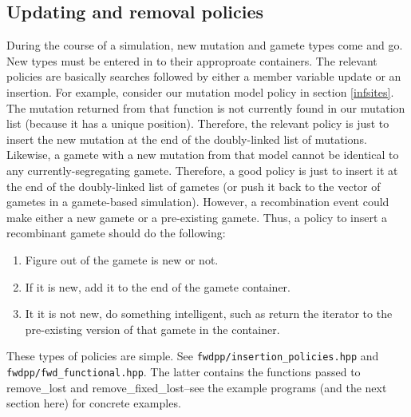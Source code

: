 \documentclass{article}
\begin{document}
\subsection{Updating and removal policies}

During the course of a simulation, new mutation and gamete types come and go.  New types must be entered in to their approproate containers.  The relevant policies are basically searches followed by either a member variable update or an insertion.  For example, consider our mutation model policy in section \ref{infsites}.  The mutation returned from that function is not currently found in our mutation list (because it has a unique position).  Therefore, the relevant policy is just to insert the new mutation at the end of the doubly-linked list of mutations.  Likewise, a gamete with a new mutation from that model cannot be identical to any currently-segregating gamete.  Therefore, a good policy is just to insert it at the end of the doubly-linked list of gametes (or push it back to the vector of gametes in a gamete-based simulation).  However, a recombination event could make either a new gamete or a pre-existing gamete.  Thus, a policy to insert a recombinant gamete should do the following:
\begin{enumerate}
\item Figure out of the gamete is new or not.
\item If it is new, add it to the end of the gamete container.
\item It it is not new, do something intelligent, such as return the iterator to the pre-existing version of that gamete in the container.
\end{enumerate}

These types of policies are simple.  See \texttt{fwdpp/insertion\_policies.hpp} and \texttt{fwdpp/fwd\_functional.hpp}.  The latter contains the functions passed to remove\_lost and remove\_fixed\_lost--see the example programs (and the next section here) for concrete examples.
\end{document}
